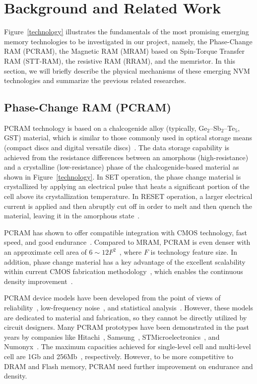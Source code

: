 \section{Background and Related Work}

Figure~\ref{technology} illustrates the fundamentals of the most promising emerging memory technologies to be investigated in our project, namely, the Phase-Change RAM (PCRAM), the Magnetic RAM (MRAM) based on Spin-Torque Transfer RAM (STT-RAM), the resistive RAM (RRAM), and the memristor. In this section, we will briefly describe the physical mechanisms of these emerging NVM technologies and summarize the previous related researches.

\subsection{Phase-Change RAM (PCRAM)}
PCRAM technology is based on a chalcogenide alloy (typically, Ge$_2$--Sb$_2$--Te$_5$, GST) material, which is similar to those commonly used in optical storage means (compact discs and digital versatile discs)~\cite{Bedeschi09}. The data storage capability is achieved from the resistance differences between an amorphous (high-resistance) and a crystalline (low-resistance) phase of the chalcogenide-based material as shown in Figure~\ref{technology}. In SET operation, the phase change material is crystallized by applying an electrical pulse that heats a significant portion of the cell above its crystallization temperature. In RESET operation, a larger electrical current is applied and then abruptly cut off in order to melt and then quench the material, leaving it in the amorphous state~\cite{burr:scm08}.

PCRAM has shown to offer compatible integration with CMOS technology, fast speed, and good endurance~\cite{Oh06,Pirovano03,Lai03}. Compared to MRAM, PCRAM is even denser with an approximate cell area of $6\sim12F^2$~\cite{ITRS07}, where $F$ is technology feature size. In addition, phase change material has a key advantage of the excellent scalability within current CMOS fabrication methodology~\cite{Cho05,Kim06,Lai01,Pirovano03,Raoux08}, which enables the continuous density improvement~\cite{Nirschl07,Chen07-iedm,Im08}.

PCRAM device models have been developed from the point of views of reliability~\cite{Ielmini07}, low-frequency noise~\cite{Fantini08}, and statistical analysis~\cite{Mantegazza07}. However, these models are dedicated to material and fabrication, so they cannot be directly utilized by circuit designers. Many PCRAM prototypes have been demonstrated in the past years by companies like Hitachi~\cite{Hanzawa07}, Samsung~\cite{Lee07-isscc}, STMicroelectronics~\cite{Bedeschi08, Sandre10}, and Numonyx~\cite{Villa10}. The maximum capacities achieved for single-level cell and multi-level cell are 1Gb and 256Mb~\cite{Villa10,Lee07-isscc}, respectively. However, to be more competitive to DRAM and Flash memory, PCRAM need further improvement on endurance and density.

